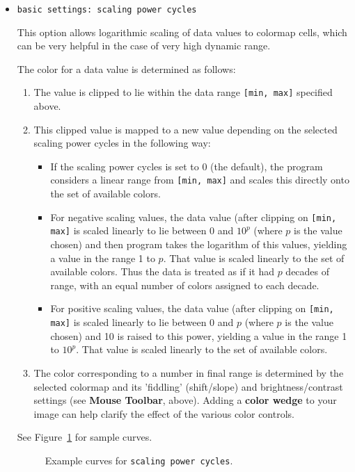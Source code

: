 \begin{itemize}
\item {\tt basic settings: scaling power cycles}

This option allows logarithmic scaling of data values to colormap cells,
which can be very helpful in the case of very high dynamic range.

The color for a data value is determined as follows: 

\begin{enumerate}

\item The value is clipped to lie within the data range {\tt [min, max]}
specified above.
\item This clipped value is mapped to a new value depending on the selected
scaling power cycles in the following way:
\begin{itemize}
\item If the scaling power cycles is set to 0 (the default), the program considers
a linear range from {\tt [min, max]} and scales this directly onto the set of available colors.
\item For negative scaling values, the data value (after clipping on {\tt [min, max]} is scaled linearly to
lie between 0 and $10^p$ (where $p$ is the value chosen) and then program takes the logarithm
of this values,  yielding a value in the range 1 to $p$.  That value is scaled linearly to the set
of available colors. Thus the data is treated as if it had $p$ decades of range, with an equal 
number of colors assigned to each decade.
\item For positive scaling values, the data value (after clipping on {\tt [min, max]} is scaled linearly to
lie between 0 and $p$ (where $p$ is the value chosen) and 10 is raised to this power, 
yielding a value in the range 1 to $10^{p}$.  That value is scaled linearly to the set
of available colors.
\end{itemize}
\item  The color corresponding to a number in final range is determined
by the selected colormap and its 'fiddling' (shift/slope) and
brightness/contrast settings (see {\bf Mouse Toolbar}, above).  Adding
a {\bf color wedge} to your image can help clarify the effect of the
various color controls.

\end{enumerate}

See Figure~\ref{fig:scalingpower} for sample curves.

\begin{figure}[h]
\begin{center}
\caption{\label{fig:scalingpower} Example curves for {\tt scaling power cycles}.}
\hrulefill
\end{center}
\end{figure}


\end{itemize}
